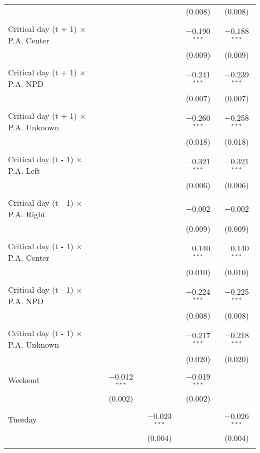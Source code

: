 \documentclass[
]{article}
\begin{document}
\begin{table}[!htbp]
{\begin{tabular}{@{\extracolsep{5pt}}lcccc}
  &  &  & (0.008) & (0.008) \\ 
  & & & & \\ 
 Critical day (t + 1) $\times$ P.A. Center &  &  & $-$0.190$^{***}$ & $-$0.188$^{***}$ \\ 
  &  &  & (0.009) & (0.009) \\ 
  & & & & \\ 
 Critical day (t + 1) $\times$ P.A. NPD &  &  & $-$0.241$^{***}$ & $-$0.239$^{***}$ \\ 
  &  &  & (0.007) & (0.007) \\ 
  & & & & \\ 
 Critical day (t + 1) $\times$ P.A. Unknown &  &  & $-$0.260$^{***}$ & $-$0.258$^{***}$ \\ 
  &  &  & (0.018) & (0.018) \\ 
  & & & & \\ 
 Critical day (t - 1) $\times$ P.A. Left &  &  & $-$0.321$^{***}$ & $-$0.321$^{***}$ \\ 
  &  &  & (0.006) & (0.006) \\ 
  & & & & \\ 
 Critical day (t - 1) $\times$ P.A. Right &  &  & $-$0.002 & $-$0.002 \\ 
  &  &  & (0.009) & (0.009) \\ 
  & & & & \\ 
 Critical day (t - 1) $\times$ P.A. Center &  &  & $-$0.140$^{***}$ & $-$0.140$^{***}$ \\ 
  &  &  & (0.010) & (0.010) \\ 
  & & & & \\ 
 Critical day (t - 1) $\times$ P.A. NPD &  &  & $-$0.224$^{***}$ & $-$0.225$^{***}$ \\ 
  &  &  & (0.008) & (0.008) \\ 
  & & & & \\ 
 Critical day (t - 1) $\times$ P.A. Unknown &  &  & $-$0.217$^{***}$ & $-$0.218$^{***}$ \\ 
  &  &  & (0.020) & (0.020) \\ 
  & & & & \\ 
 Weekend & $-$0.012$^{***}$ &  & $-$0.019$^{***}$ &  \\ 
  & (0.002) &  & (0.002) &  \\ 
  & & & & \\ 
 Tuesday &  & $-$0.023$^{***}$ &  & $-$0.026$^{***}$ \\ 
  &  & (0.004) &  & (0.004) \\ 
  & & & & \\ 

\end{tabular}}
\end{table}
\end{document}

